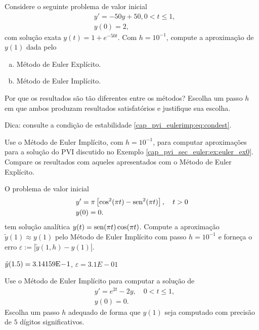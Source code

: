 \begin{exer}
  Considere o seguinte problema de valor inicial
  \begin{subequations}
    \begin{align}
      &y' = -50y + 50, 0 < t \leq 1,\\
      &y(0) = 2,
    \end{align}
  \end{subequations}
  com solução exata $y(t) = 1 + e^{-50t}$. Com $h = 10^{-1}$, compute a aproximação de $y(1)$ dada pelo
  \begin{enumerate}[a)]
  \item Método de Euler Explícito.
  \item Método de Euler Implícito.
  \end{enumerate}
  Por que os resultados são tão diferentes entre os métodos? Escolha um passo $h$ em que ambos produzam resultados satisfatórios e justifique sua escolha.
\end{exer}
\begin{resp}
  Dica: consulte a condição de estabilidade \eqref{cap_pvi_eulerimp:eq:condest}.
\end{resp}

\begin{exer}
  Use o Método de Euler Implícito, com $h=10^{-1}$, para computar aproximações para a solução do PVI discutido no Exemplo \ref{cap_pvi_sec_euler:ex:euler_ex0}. Compare os resultados com aqueles apresentados com o Método de Euler Explícito.
\end{exer}

\begin{exer}
  O problema de valor inicial
  \begin{subequations}
    \begin{align}
      &y' = \pi\left[\cos^2(\pi t) - \operatorname{sen}^2(\pi t)\right],\quad t>0\\
      &y(0) = 0.
    \end{align}
  \end{subequations}
  tem solução analítica $y(t) = \operatorname{sen}(\pi t)\cos(\pi t)$. Compute a aproximação $\tilde{y}(1) \approx y(1)$ pelo Método de Euler Implícito com passo $h=10^{-1}$ e forneça o erro $\varepsilon := \left|\tilde{y}(1, h) - y(1)\right|$.
\end{exer}
\begin{resp}
  $\tilde{y}(1.5) = 3.14159\mathrm{E}\!-\!1$, $\varepsilon = 3.1E-01$
\end{resp}

\begin{exer}
  Use o Método de Euler Implícito para computar a solução de
  \begin{subequations}
    \begin{align}
      &y' = e^{2t} - 2y,\quad 0 < t\leq 1,\\
      &y(0) = 0.
    \end{align}
  \end{subequations}
  Escolha um passo $h$ adequado de forma que $y(1)$ seja computado com precisão de $5$ dígitos significativos.
\end{exer}

